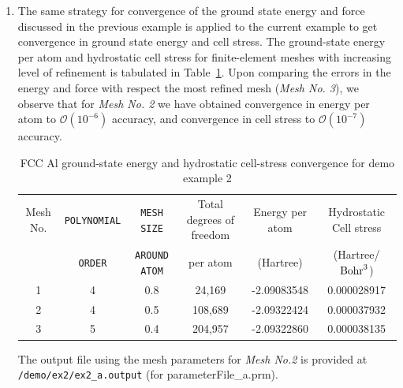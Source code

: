 \begin{enumerate}
\item The same strategy for convergence of the ground state energy and force discussed
in the previous example is applied to the current example to get convergence in ground state energy and cell stress. 
The ground-state energy per atom and hydrostatic cell stress for finite-element meshes with increasing level of refinement is tabulated in Table~\ref{tab:table2}. Upon comparing the errors in the energy and force with respect the most refined mesh (\emph{Mesh No. 3}), we observe that for \emph{Mesh No. 2} we have obtained convergence in energy per atom to $\mathcal{O}(10^{-6})$ accuracy, and convergence in cell stress to $\mathcal{O}(10^{-7})$ accuracy.
\begin{table}[h!]
  \begin{center}
\small	  
    \caption{FCC Al ground-state energy and hydrostatic cell-stress convergence for demo example 2}
    \label{tab:table2}
    \begin{tabular}{c|c|c|c|c|c} 
	    \hline\hline
	    Mesh No. &\verb|POLYNOMIAL| &\verb|MESH SIZE| & Total degrees of freedom& Energy per atom & Hydrostatic Cell stress\\
	    &\verb|ORDER| &\verb|AROUND ATOM| & per atom  & (Hartree) & (Hartree/${\rm Bohr}^3$) \\
      \hline
	    1& 4 & 0.8 & 24,169  & -2.09083548 &  0.000028917\\	    
	    2& 4 & 0.5 & 108,689 & -2.09322424 &  0.000037932\\
	    3& 5 & 0.4 & 204,957 & -2.09322860 &  0.000038135\\
       \hline\hline
    \end{tabular}
  \end{center}
\end{table}
The output file using the mesh parameters for \emph{Mesh No.2} is provided at \verb|/demo/ex2/ex2_a.output| (for parameterFile\_a.prm).


\end{enumerate}
